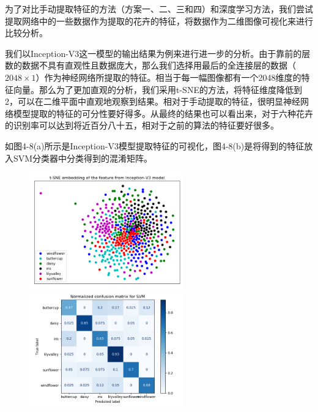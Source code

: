 \documentclass[supercite]{HustGraduPaper}
\begin{document}
\begin{sloppypar}
        为了对比手动提取特征的方法（方案一、二、三和四）和深度学习方法，我们尝试提取网络中的一些数据作为提取的花卉的特征，将数据作为二维图像可视化来进行比较分析。

        我们以Inception-V3这一模型的输出结果为例来进行进一步的分析。由于靠前的层数的数据不具有直观性且数据庞大，那么我们选择用最后的全连接层的数据（$2048\times 1$）作为神经网络所提取的特征。相当于每一幅图像都有一个2048维度的特征向量。那么为了更加直观的分析，我们采用t-SNE的方法，将特征维度降低到2，可以在二维平面中直观地观察到结果。相对于手动提取的特征，很明显神经网络模型提取的特征的可分性要好得多。从最终的结果也可以看出来，对于六种花卉的识别率可以达到将近百分八十五，相对于之前的算法的特征要好很多。

        如图4-8(a)所示是Inception-V3模型提取特征的可视化，图4-8(b)是将得到的特征放入SVM分类器中分类得到的混淆矩阵。
        \begin{figure}[H]
            \setlength{\abovecaptionskip}{0.2cm}
            \setlength{\belowcaptionskip}{-0.2cm}
            \centering%
              {\includegraphics[height=5cm]{10.png}}%
            \hspace{2em}%
                {\includegraphics[height=5cm]{11.png}}
          

\end{figure}
\end{sloppypar}
\end{document}
